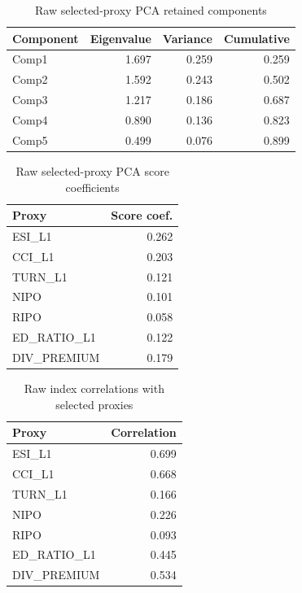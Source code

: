 \begin{table}[H]
\centering
\caption{Raw selected-proxy PCA retained components}
\label{tab:sentiment_pca_stage2_eigen}
\begin{tabular}{lrrr}
\toprule
Component & Eigenvalue & Variance & Cumulative \\
\midrule
Comp1 & 1.697 & 0.259 & 0.259 \\
Comp2 & 1.592 & 0.243 & 0.502 \\
Comp3 & 1.217 & 0.186 & 0.687 \\
Comp4 & 0.890 & 0.136 & 0.823 \\
Comp5 & 0.499 & 0.076 & 0.899 \\
\bottomrule
\end{tabular}
\end{table}

\begin{table}[H]
\centering
\caption{Raw selected-proxy PCA score coefficients}
\label{tab:sentiment_pca_stage2_coeff}
\begin{tabular}{lr}
\toprule
Proxy & Score coef. \\
\midrule
ESI\_L1 & 0.262 \\
CCI\_L1 & 0.203 \\
TURN\_L1 & 0.121 \\
NIPO & 0.101 \\
RIPO & 0.058 \\
ED\_RATIO\_L1 & 0.122 \\
DIV\_PREMIUM & 0.179 \\
\bottomrule
\end{tabular}
\end{table}

\begin{table}[H]
\centering
\caption{Raw index correlations with selected proxies}
\label{tab:sentiment_pca_stage2_corr}
\begin{tabular}{lr}
\toprule
Proxy & Correlation \\
\midrule
ESI\_L1 & 0.699 \\
CCI\_L1 & 0.668 \\
TURN\_L1 & 0.166 \\
NIPO & 0.226 \\
RIPO & 0.093 \\
ED\_RATIO\_L1 & 0.445 \\
DIV\_PREMIUM & 0.534 \\
\bottomrule
\end{tabular}
\end{table}

